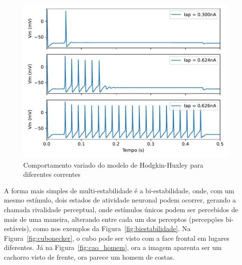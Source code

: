 \begin{figure}[tb]
	\centering
	\caption{Comportamento variado do modelo de Hodgkin-Huxley para diferentes correntes}
	\label{fig:hhdinamico}
	\includegraphics[width=0.7\linewidth]{figs/hh_dinamico}
\end{figure}
A forma mais simples de multi-estabilidade é a bi-estabilidade, onde, com um mesmo estímulo, dois estados de atividade neuronal podem ocorrer, gerando a chamada rivalidade perceptual, onde estímulos únicos podem ser percebidos de mais de uma maneira, alterando entre cada um dos perceptos (percepções bi-estáveis), como nos exemplos da Figura~\ref{fig:biestabilidade}. Na Figura~\ref{fig:cubonecker}, o cubo pode ser visto com a face frontal em lugares diferentes. Já na Figura~\ref{fig:cao_homem}, ora a imagem aparenta ser um cachorro visto de frente, ora parece um homem de costas.

